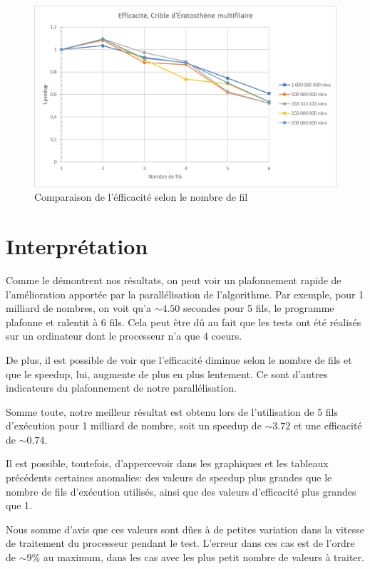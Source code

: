 \documentclass{report}
\begin{document}
\begin{center}
	\begin{figure}[H]
		\includegraphics[scale=0.7]{Images/Graph_eff.png}
		\caption{Comparaison de l'éfficacité selon le nombre de fil}
	\end{figure}
\end{center}
\section{Interprétation}
	Comme le démontrent nos résultats, on peut voir un plafonnement rapide 
	de l'amélioration apportée par la parallélisation de l'algorithme. Par 
	exemple, pour 1 milliard de nombres, on voit qu'a $\sim 4.50$ secondes 
	pour 5 fils, le programme plafonne et ralentit à 6 fils. Cela peut être 
	dû au fait que les tests ont été réalisés sur un ordinateur dont le 
	processeur n'a que 4 coeurs.
	
	\smallskip	
	De plus, il est possible de voir que l'efficacité diminue selon le 
	nombre de fils et que le speedup, lui, augmente de plus en plus lentement. 
	Ce sont d'autres indicateurs du plafonnement de notre parallélisation.
	
	\bigskip
	Somme toute, notre meilleur résultat est obtenu lors de l'utilisation de 
	5 fils d'exécution pour 1 milliard de nombre, soit un speedup de $\sim 3.72$ 
	et une efficacité de $\sim 0.74$.
	
	\bigskip
	Il est possible, toutefois, d'appercevoir dans les graphiques et les tableaux 
	précédents certaines anomalies: des valeurs de speedup plus grandes que le 
	nombre de fils d'exécution utilisés, ainsi que des valeurs d'efficacité plus 
	grandes que 1.
	
	\smallskip
	Nous somme d'avis que ces valeurs sont dûes à de petites variation dans la 
	vitesse de traitement du processeur	pendant le test. L'erreur dans ces cas 
	est de l'ordre de $\sim 9\%$ au maximum, dans les cas avec les plus petit 
	nombre de valeurs à traiter. 
	
\end{document}
